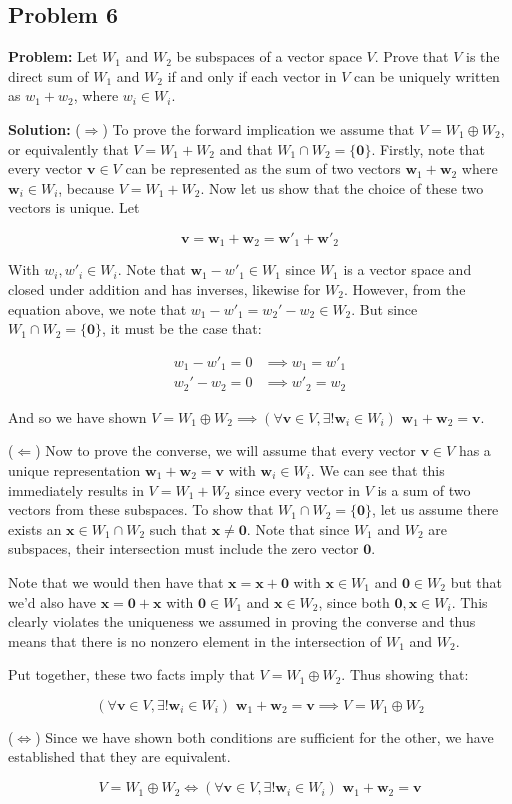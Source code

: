 \documentclass{article}
\renewcommand\vec{\mathbf}
\begin{document}
\subsection*{Problem 6}
\noindent\textbf{Problem:} Let $W_1$ and $W_2$ be subspaces of a vector space $V$. Prove that $V$ is the direct sum of $W_1$ and
$W_2$ if and only if each vector in $V$ can be uniquely written as $w_1 + w_2$, where $w_i\in W_i$.
\bigskip

\noindent\textbf{Solution:} ($\Rightarrow$) To prove the forward implication we assume that $V=W_1\oplus W_2$, or equivalently that $V=W_1+W_2$ and that $W_1\cap W_2=\{\vec 0\}$. Firstly, note that every vector $\vec v\in V$ can be represented as the sum of two vectors $\vec w_1+\vec w_2$ where $\vec w_i\in W_i$, because $V=W_1+W_2$. Now let us show that the choice of these two vectors is unique. Let

$$\vec v=\vec w_1+\vec w_2=\vec w'_1+\vec w'_2$$

With $w_i,w'_i\in W_i$. Note that $\vec w_1-w'_1\in W_1$ since $W_1$ is a vector space and closed under addition and has inverses, likewise for $W_2$. However, from the equation above, we note that $w_1-w'_1=w_2'-w_2\in W_2$. But since $W_1\cap W_2=\{\vec 0\}$, it must be the case that:

\begin{align*}
    w_1-w'_1=0&\implies w_1=w'_1\\
    w_2'-w_2=0&\implies w'_2=w_2
\end{align*}

And so we have shown $V=W_1\oplus W_2\implies(\forall\vec v\in V, \exists!\vec w_i\in W_i)\,\,\vec w_1+\vec w_2=\vec v$.
\newline

($\Leftarrow$) Now to prove the converse, we will assume that every vector $\vec v\in V$ has a unique representation $\vec w_1+\vec w_2=\vec v$ with $\vec w_i\in W_i$. We can see that this immediately results in $V=W_1+W_2$ since every vector in $V$ is a sum of two vectors from these subspaces. To show that $W_1\cap W_2=\{\vec 0\}$, let us assume there exists an $\vec x\in W_1\cap W_2$ such that $\vec x\not=\vec 0$. Note that since $W_1$ and $W_2$ are subspaces, their intersection must include the zero vector $\vec 0$.

Note that we would then have that $\vec x=\vec x+\vec 0$ with $\vec x\in W_1$ and $\vec 0\in W_2$ but that we'd also have $\vec x=\vec 0+\vec x$ with $\vec 0\in W_1$ and $\vec x\in W_2$, since both $\vec 0,\vec x\in W_i$. This clearly violates the uniqueness we assumed in proving the converse and thus means that there is no nonzero element in the intersection of $W_1$ and $W_2$.

Put together, these two facts imply that $V=W_1\oplus W_2$. Thus showing that:

$$(\forall\vec v\in V, \exists!\vec w_i\in W_i)\,\,\vec w_1+\vec w_2=\vec v\implies V=W_1\oplus W_2$$

($\Leftrightarrow$) Since we have shown both conditions are sufficient for the other, we have established that they are equivalent.

$$V=W_1\oplus W_2\iff(\forall\vec v\in V, \exists!\vec w_i\in W_i)\,\,\vec w_1+\vec w_2=\vec v$$
\end{document}
